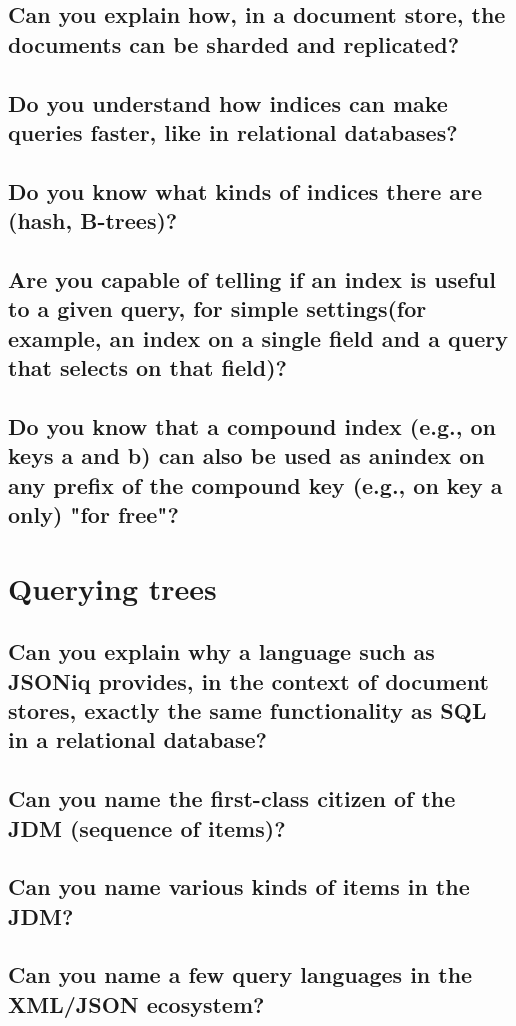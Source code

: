 \documentclass{article}
\begin{document}
\subsection{Can you explain how, in a document store, the documents can be sharded and replicated?}
\subsection{Do you understand how indices can make queries faster, like in relational databases?}
\subsection{Do you know what kinds of indices there are (hash, B-trees)?}
\subsection{Are you capable of telling if an index is useful to a given query, for simple settings(for example, an index on a single field and a query that selects on that field)?}
\subsection{Do you know that a compound index (e.g., on keys a and b) can also be used as anindex on any prefix of the compound key (e.g., on key a only) "for free"?}

\pagebreak

\section{Querying trees}
\subsection{Can you explain why a language such as JSONiq provides, in the context of document stores, exactly the same functionality as SQL in a relational database?}
\subsection{Can you name the first-class citizen of the JDM (sequence of items)?}
\subsection{Can you name various kinds of items in the JDM?}
\subsection{Can you name a few query languages in the XML/JSON ecosystem?}
\end{document}
